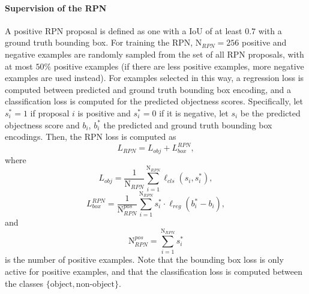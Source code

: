 \paragraph{Supervision of the RPN}
A positive RPN proposal is defined as one with a IoU of at least $0.7$ with
a ground truth bounding box. For training the RPN, $\text{N}_{RPN} = 256$  positive and negative
examples are randomly sampled from the set of all RPN proposals,
with at most $50\%$ positive examples (if there are less positive examples,
more negative examples are used instead).
For examples selected in this way, a regression loss is computed between
predicted and ground truth bounding box encoding, and a classification loss
is computed for the predicted objectness scores.
Specifically, let $s_i^* = 1$ if proposal $i$ is positive and $s_i^* = 0$ if
it is negative, let $s_i$ be the predicted objectness score and $b_i$, $b_i^*$ the
predicted and ground truth bounding box encodings.
Then, the RPN loss is computed as
\begin{equation}
L_{RPN} = L_{obj} + L_{box}^{RPN},
\end{equation}
where
\begin{equation}
L_{obj} = \frac{1}{\text{N}_{RPN}} \sum_{i=1}^{\text{N}_{RPN}} \ell_{cls}(s_i, s_i^*),
\end{equation}
\begin{equation}
L_{box}^{RPN} = \frac{1}{\text{N}_{RPN}^{pos}} \sum_{i=1}^{\text{N}_{RPN}} s_i^* \cdot \ell_{reg}(b_i^* - b_i),
\end{equation}
and
\begin{equation}
\text{N}_{RPN}^{pos} = \sum_{i=1}^{\text{N}_{RPN}} s_i^*
\end{equation}
is the number of positive examples. Note that the bounding box loss is only
active for positive examples, and that the classification loss is computed
between the classes $\{\textrm{object},\textrm{non-object}\}$.

